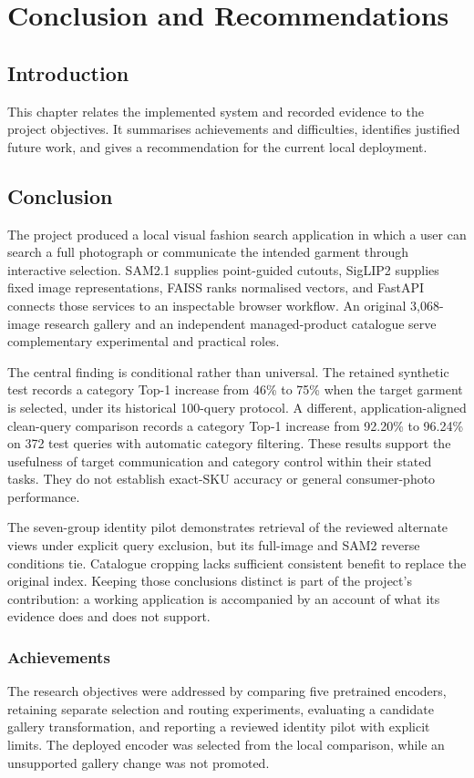\chapter{Conclusion and Recommendations}
\label{ch:conclusion}

\section{Introduction}
This chapter relates the implemented system and recorded evidence to the project objectives. It summarises achievements and difficulties, identifies justified future work, and gives a recommendation for the current local deployment.

\section{Conclusion}
The project produced a local visual fashion search application in which a user
can search a full photograph or communicate the intended garment through
interactive selection. SAM2.1 supplies point-guided cutouts, SigLIP2 supplies
fixed image representations, FAISS ranks normalised vectors, and FastAPI
connects those services to an inspectable browser workflow. An original
3,068-image research gallery and an independent managed-product catalogue
serve complementary experimental and practical roles.

The central finding is conditional rather than universal. The retained synthetic
test records a category Top-1 increase from 46\% to 75\% when the target garment
is selected, under its historical 100-query protocol. A different,
application-aligned clean-query comparison records a category Top-1 increase
from 92.20\% to 96.24\% on 372 test queries with automatic category filtering.
These results support the usefulness of target communication and category
control within their stated tasks. They do not establish exact-SKU accuracy or
general consumer-photo performance.

The seven-group identity pilot demonstrates retrieval of the reviewed alternate
views under explicit query exclusion, but its full-image and SAM2 reverse
conditions tie. Catalogue cropping lacks sufficient consistent benefit to
replace the original index. Keeping those conclusions distinct is part of the
project's contribution: a working application is accompanied by an account of
what its evidence does and does not support.
\subsection{Achievements}
The research objectives were addressed by comparing five pretrained encoders,
retaining separate selection and routing experiments, evaluating a candidate
gallery transformation, and reporting a reviewed identity pilot with explicit
limits. The deployed encoder was selected from the local comparison, while an
unsupported gallery change was not promoted.

